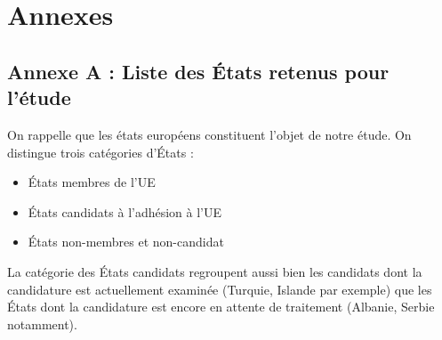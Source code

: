 \FloatBarrier
\vfill
\pagebreak
\section{Annexes}
\subsection*{Annexe A : Liste des États retenus pour l'étude}

On rappelle que les états européens constituent l'objet de notre étude. On
distingue trois catégories d'États : 
\begin{itemize}
\item États membres de l'UE
\item États candidats à l'adhésion à l'UE
\item États non-membres et non-candidat
\end{itemize}

\vskip 6pt

La catégorie des États candidats regroupent aussi bien les candidats dont
la candidature est actuellement examinée (Turquie, Islande par exemple) que
les États dont la candidature est encore en attente de traitement (Albanie,
Serbie notamment).

